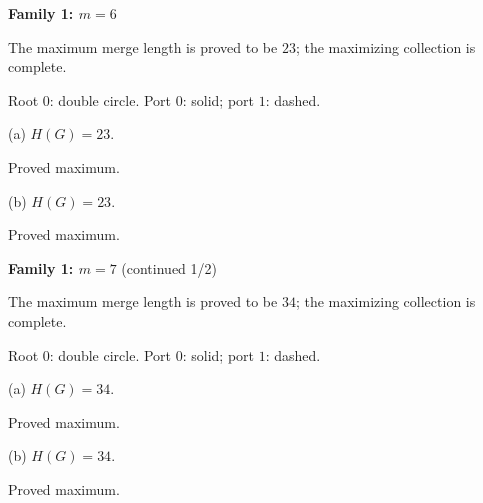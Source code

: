 \documentclass[10pt,a4paper]{article}
\begin{document}
\clearpage
{\Large\bfseries Family 1: $m=6$}\par
\vspace{2mm}
{\small The maximum merge length is proved to be $23$; the maximizing collection is complete.}\par
\vspace{1mm}
{\small Root $0$: double circle. Port $0$: solid; port $1$: dashed.}\par
\vspace{3mm}
\noindent\hfill
\begin{minipage}[t]{.48\textwidth}\centering
\resizebox{8.2cm}{!}{}\par
{\footnotesize (a) $H(G)=23$.\par Proved maximum.}\par
\end{minipage}\hfill
\begin{minipage}[t]{.48\textwidth}\centering
\resizebox{8.2cm}{!}{}\par
{\footnotesize (b) $H(G)=23$.\par Proved maximum.}\par
\end{minipage}\hfill
\par\vspace{2.5mm}
\clearpage
{\Large\bfseries Family 1: $m=7$} (continued 1/2)\par
\vspace{2mm}
{\small The maximum merge length is proved to be $34$; the maximizing collection is complete.}\par
\vspace{1mm}
{\small Root $0$: double circle. Port $0$: solid; port $1$: dashed.}\par
\vspace{3mm}
\noindent\hfill
\begin{minipage}[t]{.48\textwidth}\centering
\resizebox{8.2cm}{!}{}\par
{\footnotesize (a) $H(G)=34$.\par Proved maximum.}\par
\end{minipage}\hfill
\begin{minipage}[t]{.48\textwidth}\centering
\resizebox{8.2cm}{!}{}\par
{\footnotesize (b) $H(G)=34$.\par Proved maximum.}\par
\end{minipage}\hfill
\end{document}
